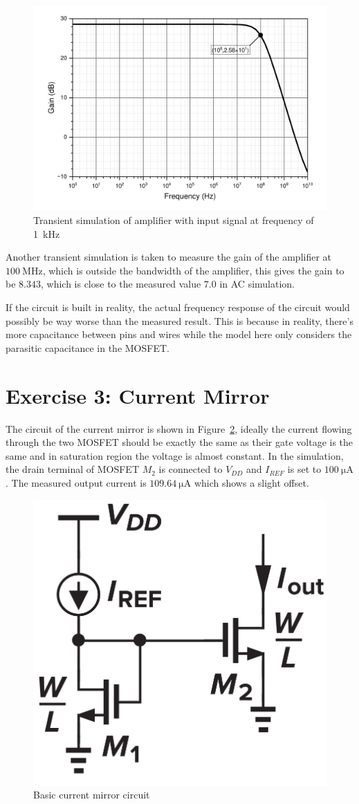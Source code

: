 \documentclass[12pt]{article}   %
\begin{document}
	\begin{figure}[htbp]
		\centering
		\includegraphics[width=0.7\linewidth]{Figures/E2_Inverting_Amplifier/AC_analysis}
		\caption{Transient simulation of amplifier with input signal at frequency of \SI{1}{\kilo\hertz}}
		\label{fig:ac_analysis_inv}
	\end{figure}
	
	Another transient simulation is taken to measure the gain of the amplifier at $\SI{100}{\mega\hertz}$, which is outside the bandwidth of the amplifier, this gives the gain to be $8.343$, which is close to the measured value $7.0$ in AC simulation.
	
	If the circuit is built in reality, the actual frequency response of the circuit would possibly be way worse than the measured result. This is because in reality, there's more capacitance between pins and wires while the model here only considers the parasitic capacitance in the MOSFET.
	
	\newpage
	
	\section{Exercise 3: Current Mirror}
	
	The circuit of the current mirror is shown in Figure~\ref{fig:currentMirror}, ideally the current flowing through the two MOSFET should be exactly the same as their gate voltage is the same and in saturation region the voltage is almost constant. In the simulation, the drain terminal of MOSFET $M_2$ is connected to $V_{DD}$ and $I_{REF}$ is set to $\SI{100}{\micro\ampere}$. The measured output current is $\SI{109.64}{\micro\ampere}$ which shows a slight offset.
	
	\begin{figure}[htbp]
		\centering
		\includegraphics[width=0.3\linewidth]{Figures/E3_Current_Mirror/current_mirror}
		\caption{Basic current mirror circuit\cite{razaviDesignAnalogCMOS2017}}
		\label{fig:currentMirror}
	\end{figure}
	
\end{document}
